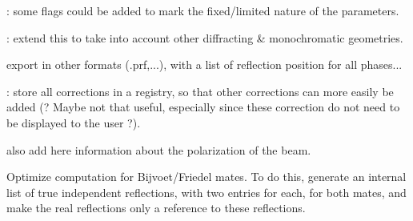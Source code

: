 \begin{DoxyRefList}
\item[Class \mbox{\hyperlink{struct_obj_cryst_1_1_mol_z_atom}{Obj\+Cryst::Mol\+Z\+Atom}} ]\label{todo__todo000004}%
%
\+: some flags could be added to mark the fixed/limited nature of the parameters.  
\item[Class \mbox{\hyperlink{class_obj_cryst_1_1_polarization_corr}{Obj\+Cryst::Polarization\+Corr}} ]\label{todo__todo000007}%
%
\+: extend this to take into account other diffracting \& monochromatic geometries.  
\item[Member \mbox{\hyperlink{class_obj_cryst_1_1_powder_pattern_ae9646ceed205b350e0dfa8f1bc5c3e17}{Obj\+Cryst::Powder\+Pattern::Save\+Powder\+Pattern}} (const string \&filename=\char`\"{}powder\+Pattern.\+out\char`\"{}) const]\label{todo__todo000006}%
%
export in other formats (.prf,...), with a list of reflection position for all phases...  
\item[Member \mbox{\hyperlink{class_obj_cryst_1_1_powder_pattern_diffraction_addc10ae4a02801eb441e38b4beae2e9a}{Obj\+Cryst::Powder\+Pattern\+Diffraction::m\+Intensity\+Corr}} ]\label{todo__todo000005}%
%
\+: store all corrections in a registry, so that other corrections can more easily be added (? Maybe not that useful, especially since these correction do not need to be displayed to the user ?).  
\item[Class \mbox{\hyperlink{class_obj_cryst_1_1_radiation}{Obj\+Cryst::Radiation}} ]\label{todo__todo000008}%
%
also add here information about the polarization of the beam.  
\item[Class \mbox{\hyperlink{class_obj_cryst_1_1_scattering_data}{Obj\+Cryst::Scattering\+Data}} ]\label{todo__todo000009}%
%
Optimize computation for Bijvoet/\+Friedel mates. To do this, generate an internal list of \textquotesingle{}true independent reflections\textquotesingle{}, with two entries for each, for both mates, and make the \textquotesingle{}real\textquotesingle{} reflections only a reference to these reflections.


\end{DoxyRefList}

